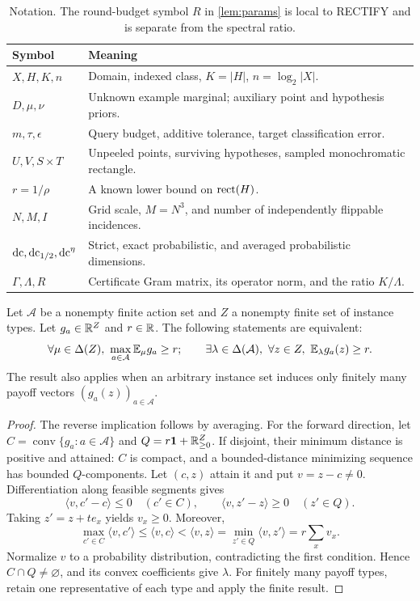 \begin{table}[t]
\centering\small
\begin{tabularx}{\linewidth}{@{}p{.23\linewidth}X@{}}
\toprule
Symbol & Meaning\\\midrule
$X,H,K,n$ & Domain, indexed class, $K=|H|$, $n=\log_2|X|$.\\
$D,\mu,\nu$ & Unknown example marginal; auxiliary point and hypothesis priors.\\
$m,\tau,\epsilon$ & Query budget, additive tolerance, target classification error.\\
$U,V,S\times T$ & Unpeeled points, surviving hypotheses, sampled monochromatic rectangle.\\
$r=1/\rho$ & A known lower bound on $\operatorname{rect}(H)$.\\
$N,M,I$ & Grid scale, $M=N^3$, and number of independently flippable incidences.\\
$\operatorname{dc},\operatorname{dc}_{1/2},\operatorname{dc}^\eta$ & Strict, exact probabilistic, and averaged probabilistic dimensions.\\
$\Gamma,\Lambda,R$ & Certificate Gram matrix, its operator norm, and the ratio $K/\Lambda$.\\
\bottomrule
\end{tabularx}
\caption{Notation. The round-budget symbol $R$ in \cref{lem:params} is local to RECTIFY and is separate from the spectral ratio.}\label{tab:notation}
\end{table}

\begin{lemma}\label{lem:finite-minimax}
Let $\mathcal A$ be a nonempty finite action set and $Z$ a nonempty finite set of instance types. Let $g_a\in\mathbb R^Z$ and $r\in\mathbb R$. The following statements are equivalent:
\[
 \forall\mu\in\Delta(Z),\ \max_{a\in\mathcal A}\E_\mu g_a\ge r;
 \qquad
 \exists\lambda\in\Delta(\mathcal A),\ \forall z\in Z,\ \E_\lambda g_a(z)\ge r.
\]
The result also applies when an arbitrary instance set induces only finitely many payoff vectors $(g_a(z))_{a\in\mathcal A}$.
\end{lemma}
\begin{proof}
The reverse implication follows by averaging. For the forward direction, let $C=\operatorname{conv}\{g_a:a\in\mathcal A\}$ and $Q=r\mathbf 1+\mathbb R_{\ge0}^Z$. If disjoint, their minimum distance is positive and attained: $C$ is compact, and a bounded-distance minimizing sequence has bounded $Q$-components. Let $(c,z)$ attain it and put $v=z-c\ne0$. Differentiation along feasible segments gives
\[
 \langle v,c'-c\rangle\le0\quad(c'\in C),\qquad
 \langle v,z'-z\rangle\ge0\quad(z'\in Q).
\]
Taking $z'=z+te_x$ yields $v_x\ge0$. Moreover,
\[
 \max_{c'\in C}\langle v,c'\rangle
 \le\langle v,c\rangle<\langle v,z\rangle
 =\min_{z'\in Q}\langle v,z'\rangle=r\sum_xv_x.
\]
Normalize $v$ to a probability distribution, contradicting the first condition. Hence $C\cap Q\ne\varnothing$, and its convex coefficients give $\lambda$. For finitely many payoff types, retain one representative of each type and apply the finite result.
\end{proof}

